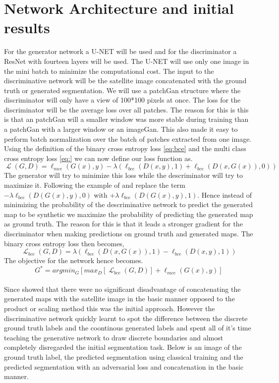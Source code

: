 \documentclass[a4paper,11pt]{article}
\DeclareMathOperator{\Lagr}{\mathcal{L}}
\begin{document}
\section{Network Architecture and initial results}
For the generator network a U-NET will be used and for the discriminator a ResNet with fourteen layers will be used. The U-NET will use only one image in the mini batch to minimize the computational cost. The input to the discriminative network will be the satellite image concatenated with the ground truth or generated segmentation. We will use a patchGan structure where the discriminator will only have a view of 100*100 pixels at once. The loss for the discriminator will be the average loss over all patches. The reason for this is this is that an patchGan will a smaller window was more stable during training than a patchGan with a larger window or an imageGan. This also made it easy to perform batch normalization over the batch of patches extracted from one image. Using the definition of the binary cross entropy loss \eqref{eq:bce} and the multi class cross entropy loss \eqref{eq:} we can now define our loss function as.
\begin{equation}
\Lagr(G, D) = \ell_{mce}(G(x),y)-\lambda(\ell_{bce}(D(x,y), 1)+\ell_{bce}(D(x,G(x)), 0))
\end{equation}
The generator will try to minimize this loss while the descriminator will try to maximize it. Following the example of \cite{goodfellow_generative_2014, luc_semantic_2016} and replace the term $-\lambda\ell_{bce}(D(G(x),y), 0)$ with  $+\lambda\ell_{bce}(D(G(x),y), 1)$. Hence instead of minimizing the probability of the descriminative network to predict the generated map to be synthetic we maximize the probability of predicting the generated map as ground truth. The reason for this is that it leads a stronger gradient for the discriminator when making predictions on ground truth and generated maps. The binary cross entropy loss then becomes,
\begin{equation}
\Lagr_{bce}(G, D) =\lambda(\ell_{bce}(D(x,G(x)), 1)-\ell_{bce}(D(x,y), 1))
\end{equation}
The objective for the network hence becomes.
\begin{equation}
G^{*}=argmin_{G}[max_{D}[\Lagr_{bce}(G, D)] + \ell_{mce}(G(x),y)]
\end{equation}
\\
Since \cite{luc_semantic_2016} showed that there were no significant disadvantage of concatenating the generated maps with the satellite image in the basic manner opposed to the product or scaling method this was the initial approach. However the discriminative network quickly learnt to spot the difference between the discrete ground truth labels and the coontinous generated labels and spent all of it's time teaching the generative network to draw discrete boundaries and almost completely disregarded the initial segmentation task. Below is an image of the ground truth label, the predicted segmentation using classical training and the predicted segmentation with an adversarial loss and concatenation in the basic manner.
\end{document}
